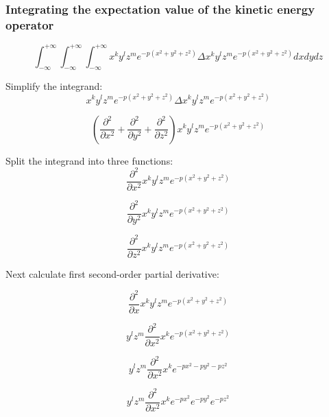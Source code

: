 \subsubsection{Integrating the expectation value of the kinetic energy operator}
\begin{equation}
	\int_{-\infty}^{+\infty} \int_{-\infty}^{+\infty} \int_{-\infty}^{+\infty} 
	x^k y^l z^m e^{-p (x^2+y^2+z^2)} \Delta x^k y^l z^m e^{-p(x^2+y^2+z^2)}
	dx dy dz
\end{equation}

\noindent Simplify the integrand:
\begin{equation}
	x^k y^l z^m e^{-p (x^2+y^2+z^2)} \Delta x^k y^l z^m e^{-p(x^2+y^2+z^2)}
\end{equation}

\begin{equation}
	(\frac{\partial^2}{\partial x^2} + \frac{\partial^2}{\partial y^2} + \frac{\partial^2}{\partial z^2})x^k y^l z^m e^{-p(x^2+y^2+z^2)}
\end{equation}

\noindent Split the integrand into three functions:
\begin{equation}
	\frac{\partial^2}{\partial x^2} x^k y^l z^m e^{-p(x^2+y^2+z^2)}
\end{equation}

\begin{equation}
	\frac{\partial^2}{\partial y^2} x^k y^l z^m e^{-p(x^2+y^2+z^2)}
\end{equation}

\begin{equation}
	\frac{\partial^2}{\partial z^2} x^k y^l z^m e^{-p(x^2+y^2+z^2)}
\end{equation}

\noindent Next calculate first second-order partial derivative:

\begin{equation}
	\frac{\partial^2}{\partial x} x^k y^l z^m e^{-p(x^2+y^2+z^2)}
\end{equation}

\begin{equation}
	y^l z^m \frac{\partial^2}{\partial x^2} x^k e^{-p(x^2+y^2+z^2)}
\end{equation}

\begin{equation}
	y^l z^m \frac{\partial^2}{\partial x^2} x^k e^{-px^2-py^2-pz^2}
\end{equation}

\begin{equation}
	y^l z^m \frac{\partial^2}{\partial x^2} x^k e^{-px^2}e^{-py^2}e^{-pz^2}
\end{equation}

